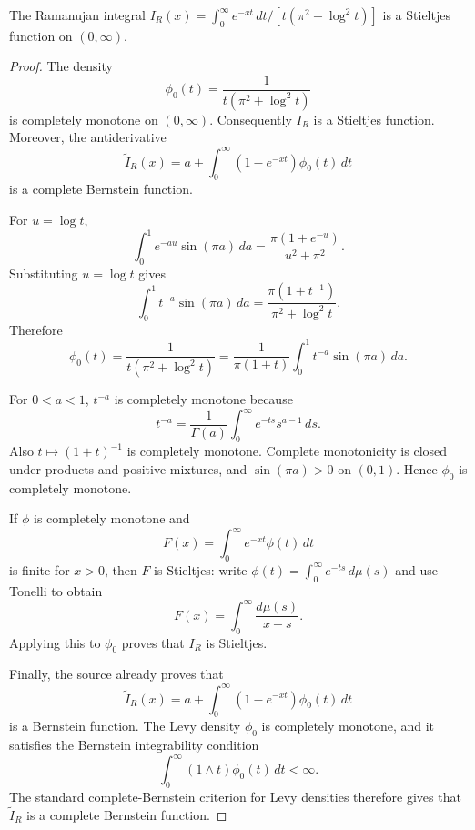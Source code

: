 \begin{proposition}
\label{res:ramanujan-integral-stieltjes}
The Ramanujan integral \(I_R(x)=\int_0^\infty e^{-xt}\,dt/[t(\pi^2+\log^2 t)]\) is a Stieltjes function on \((0,\infty)\).
\end{proposition}
\begin{proof}
The density
\[
\phi_0(t)=\frac{1}{t(\pi^2+\log^2 t)}
\]
is completely monotone on \((0,\infty)\). Consequently \(I_R\) is a Stieltjes function. Moreover, the antiderivative
\[
\widetilde I_R(x)=a+\int_0^\infty (1-e^{-xt})\phi_0(t)\,dt
\]
is a complete Bernstein function.

For \(u=\log t\),
\[
\int_0^1 e^{-au}\sin(\pi a)\,da
=\frac{\pi(1+e^{-u})}{u^2+\pi^2}.
\]
Substituting \(u=\log t\) gives
\[
\int_0^1 t^{-a}\sin(\pi a)\,da
=\frac{\pi(1+t^{-1})}{\pi^2+\log^2 t}.
\]
Therefore
\[
\phi_0(t)
=\frac{1}{t(\pi^2+\log^2 t)}
=\frac{1}{\pi(1+t)}\int_0^1 t^{-a}\sin(\pi a)\,da.
\]

For \(0<a<1\), \(t^{-a}\) is completely monotone because
\[
t^{-a}=\frac1{\Gamma(a)}\int_0^\infty e^{-ts}s^{a-1}\,ds.
\]
Also \(t\mapsto(1+t)^{-1}\) is completely monotone. Complete monotonicity is closed under products and positive mixtures, and \(\sin(\pi a)>0\) on \((0,1)\). Hence \(\phi_0\) is completely monotone.

If \(\phi\) is completely monotone and
\[
F(x)=\int_0^\infty e^{-xt}\phi(t)\,dt
\]
is finite for \(x>0\), then \(F\) is Stieltjes: write \(\phi(t)=\int_0^\infty e^{-ts}\,d\mu(s)\) and use Tonelli to obtain
\[
F(x)=\int_0^\infty\frac{d\mu(s)}{x+s}.
\]
Applying this to \(\phi_0\) proves that \(I_R\) is Stieltjes.

Finally, the source already proves that
\[
\widetilde I_R(x)=a+\int_0^\infty (1-e^{-xt})\phi_0(t)\,dt
\]
is a Bernstein function. The Levy density \(\phi_0\) is completely monotone, and it satisfies the Bernstein integrability condition
\[
\int_0^\infty (1\wedge t)\phi_0(t)\,dt<\infty.
\]
The standard complete-Bernstein criterion for Levy densities therefore gives that \(\widetilde I_R\) is a complete Bernstein function.
\end{proof}
